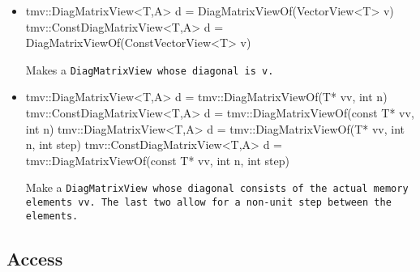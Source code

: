 \begin{itemize}
\item
\begin{tmvcode}
tmv::DiagMatrixView<T,A> d = DiagMatrixViewOf(VectorView<T> v)
tmv::ConstDiagMatrixView<T,A> d = 
      DiagMatrixViewOf(ConstVectorView<T> v)
\end{tmvcode}
Makes a \tt{DiagMatrixView} whose diagonal is \tt{v}.

\item
\begin{tmvcode}
tmv::DiagMatrixView<T,A> d = tmv::DiagMatrixViewOf(T* vv, int n)
tmv::ConstDiagMatrixView<T,A> d = 
      tmv::DiagMatrixViewOf(const T* vv, int n)
tmv::DiagMatrixView<T,A> d = 
      tmv::DiagMatrixViewOf(T* vv, int n, int step)
tmv::ConstDiagMatrixView<T,A> d = 
      tmv::DiagMatrixViewOf(const T* vv, int n, int step)
\end{tmvcode}
Make a \tt{DiagMatrixView} whose diagonal consists of the actual memory elements \tt{vv}.  The last two allow for a non-unit step between the elements.

\end{itemize}


\subsection{Access}
\label{DiagMatrix_Access}


